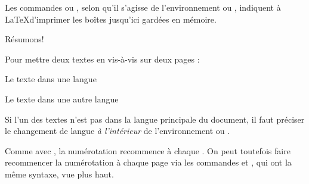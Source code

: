 Les commandes  ou , selon qu'il s'agisse de l'environnement  ou , indiquent à \LaTeX  d'imprimer les boîtes jusqu'ici gardées en mémoire. 



Résumons!

Pour mettre deux textes en vis-à-vis sur deux pages :

\begin{latexcode}

\begin{pages}  %
\begin{Leftside} %
\beginnumbering %
\pstart %
 
Le texte dans une langue 
 
\pend
\endnumbering  %
\end{Leftside} %
 
\begin{Rightside}  %
\beginnumbering
\pstart
 
Le texte dans une autre langue
 
\pend
\endnumbering
\end{Rightside} 
\Pages

\end{pages} %
\end{latexcode}

\begin{attention}
Si l'un des textes n'est pas dans la langue principale du document, il faut préciser le changement de langue \emph{à l'intérieur} de l'environnement  ou .

\begin{latexcode}
\begin{Leftside}
\begin{<langue>}
\end{<langue>}
\end{Leftside}
\end{latexcode}
\end{attention}

\begin{attention}
Comme avec , la numérotation recommence à chaque . On peut toutefois faire recommencer la numérotation  à chaque page via les commandes  et , qui ont la même syntaxe, vue plus haut.
\end{attention}

